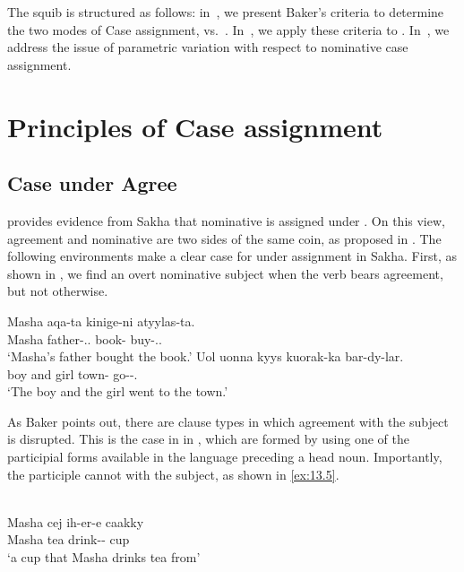 \documentclass[output=paper]{langsci/langscibook}
\begin{document}
The squib is structured as follows: in~, we
present Baker’s criteria to determine the two modes of Case assignment,
 vs.\ . In~, we apply these
criteria to .  In~, we address the issue of
parametric variation with respect to nominative case
assignment.

\section{Principles of Case assignment}\label{sec:13.2}

\subsection{Case under Agree}\label{sec:13.2.1}

\textcite[29f.]{Baker2015} provides evidence from Sakha that
nominative is assigned under . On this view,
agreement and nominative are two sides of the same coin, as
proposed in \citet{Chomsky2001}. The following environments make a clear case
for \Nom{} under  assignment in Sakha. First, as shown in
, we find an overt nominative subject when
the verb bears agreement, but not otherwise.

\ea%
    \label{ex:13.4}  \parencite[29]{Baker2015}
	\ea
	\gll  Masha aqa-ta kinige-ni atyylas-ta.\\
	    Masha father-\Tsg.\Poss{}.\Nom{}  book-\Acc{}  buy-\Pst{}.\Tsg.\Sbj{}\\
	\glt     ‘Masha’s father bought the book.’
	\ex
	\gll  Uol uonna kyys kuorak-ka bar-dy-lar.\\
        boy and girl town-\Dat{}  go-\Pst{}-\Tpl.\Sbj{}\\
	\glt     ‘The boy and the girl went to the town.’
    \z
\z

As Baker points out, there are clause types in which agreement with the
subject
is disrupted. This is the case in  in , which are formed
by using one of the participial forms available in the language preceding a
head noun. Importantly, the participle cannot  with the subject, as shown
in \eqref{ex:13.5}.

\ea%
    \label{ex:13.5} \parencite[30]{Baker2015}\\
    \gll \llap{*}Masha cej ih-er-e caakky\\
        Masha tea drink-\Aor{}-\Tsg{} cup\\
    \glt ‘a cup that Masha drinks tea from’
\z
\end{document}
